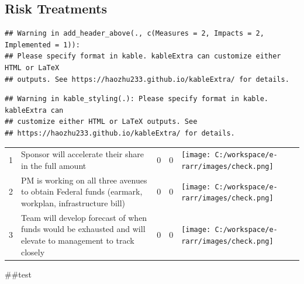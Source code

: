 \documentclass[
]{article}
\begin{document}
\hypertarget{risk-treatments}{%
\subsection{Risk Treatments}\label{risk-treatments}}

\begin{verbatim}
## Warning in add_header_above(., c(Measures = 2, Impacts = 2, Implemented = 1)):
## Please specify format in kable. kableExtra can customize either HTML or LaTeX
## outputs. See https://haozhu233.github.io/kableExtra/ for details.
\end{verbatim}

\begin{verbatim}
## Warning in kable_styling(.): Please specify format in kable. kableExtra can
## customize either HTML or LaTeX outputs. See
## https://haozhu233.github.io/kableExtra/ for details.
\end{verbatim}

\begin{longtable}[]{@{}rlrrl@{}}
\toprule
\endhead
1 & Sponsor will accelerate their share in the full amount & 0 & 0 &
\texttt{[image: C:/workspace/e-rarr/images/check.png]} \\
2 & PM is working on all three avenues to obtain Federal funds (earmark,
workplan, infrastructure bill) & 0 & 0 &
\texttt{[image: C:/workspace/e-rarr/images/check.png]} \\
3 & Team will develop forecast of when funds would be exhausted and will
elevate to management to track closely & 0 & 0 &
\texttt{[image: C:/workspace/e-rarr/images/check.png]} \\
\bottomrule
\end{longtable}

\#\#test
\end{document}
